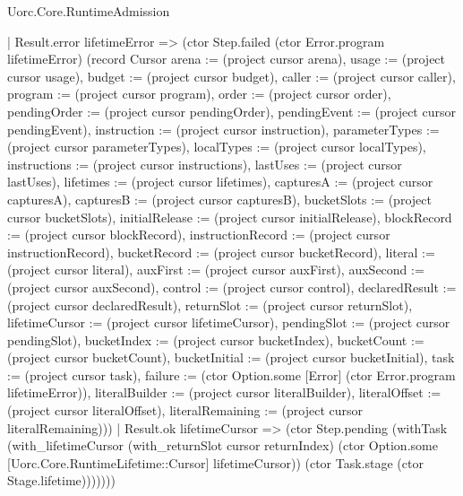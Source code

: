 \begin{lexlean}{Uorc.Core.RuntimeAdmission}
\begin{semanticmodule}
{                | Result.error lifetimeError => (ctor Step.failed (ctor Error.program lifetimeError) (record Cursor {arena := (project cursor arena), usage := (project cursor usage), budget := (project cursor budget), caller := (project cursor caller), program := (project cursor program), order := (project cursor order), pendingOrder := (project cursor pendingOrder), pendingEvent := (project cursor pendingEvent), instruction := (project cursor instruction), parameterTypes := (project cursor parameterTypes), localTypes := (project cursor localTypes), instructions := (project cursor instructions), lastUses := (project cursor lastUses), lifetimes := (project cursor lifetimes), capturesA := (project cursor capturesA), capturesB := (project cursor capturesB), bucketSlots := (project cursor bucketSlots), initialRelease := (project cursor initialRelease), blockRecord := (project cursor blockRecord), instructionRecord := (project cursor instructionRecord), bucketRecord := (project cursor bucketRecord), literal := (project cursor literal), auxFirst := (project cursor auxFirst), auxSecond := (project cursor auxSecond), control := (project cursor control), declaredResult := (project cursor declaredResult), returnSlot := (project cursor returnSlot), lifetimeCursor := (project cursor lifetimeCursor), pendingSlot := (project cursor pendingSlot), bucketIndex := (project cursor bucketIndex), bucketCount := (project cursor bucketCount), bucketInitial := (project cursor bucketInitial), task := (project cursor task), failure := (ctor Option.some [Error] (ctor Error.program lifetimeError)), literalBuilder := (project cursor literalBuilder), literalOffset := (project cursor literalOffset), literalRemaining := (project cursor literalRemaining)}))
                | Result.ok lifetimeCursor => (ctor Step.pending (withTask (with_lifetimeCursor (with_returnSlot cursor returnIndex) (ctor Option.some [Uorc.Core.RuntimeLifetime::Cursor] lifetimeCursor)) (ctor Task.stage (ctor Stage.lifetime)))))))
}
\end{semanticmodule}
\end{lexlean}
